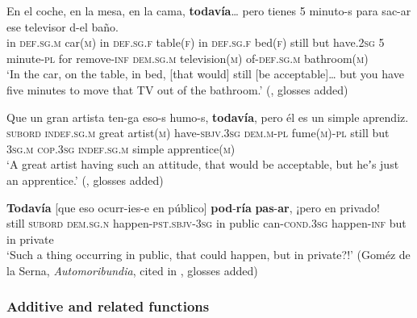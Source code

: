 \begin{exe}
	\ex\label{exAppendixSpanishTodaviaAcceptableLimits1}	
	\gll En el coche, en la mesa, en la cama, \textbf{todavía}… pero tienes 5 minuto-s para sac-ar ese televisor d-el baño.\\
	in \textsc{def}.\textsc{sg}.\textsc{m} car(\textsc{m}) in \textsc{def}.\textsc{sg}.\textsc{f} table(\textsc{f}) in \textsc{def}.\textsc{sg}.\textsc{f} bed(\textsc{f}) still but have.2\textsc{sg} 5 minute-\textsc{pl} for remove-\textsc{inf} \textsc{dem}.\textsc{sg}.\textsc{m} television(\textsc{m}) of-\textsc{def}.\textsc{sg}.\textsc{m} bathroom(\textsc{m})\\
	\glt \lq In the car, on the table, in bed, [that would] still [be acceptable]… but you have five minutes to move that TV out of the bathroom.' (\cite{Deloor2012}, glosses added)
	
	\ex\label{exAppendixSpanishTodaviaAcceptableLimits2}
	\gll Que un gran artista ten-ga eso-s humo-s, \textbf{todavía}, pero él es un simple aprendiz.\\
	\textsc{subord} \textsc{indef}.\textsc{sg}.\textsc{m} great artist(\textsc{m}) have-\textsc{sbjv}.3\textsc{sg} \textsc{dem}.\textsc{m}-\textsc{pl} fume(\textsc{m})-\textsc{pl} still but \textsc{3sg.m} \textsc{cop}.3\textsc{sg} \textsc{indef}.\textsc{sg}.\textsc{m} simple apprentice(\textsc{m})\\
	\glt \lq A great artist having such an attitude, that would be acceptable, but heʼs just an apprentice.\rq{ }(\cite[207]{Bosque2016}, glosses added)
	
	\ex\label{exAppendixSpanishTodaviaAcceptableLimits3}
	\gll
	\textbf{Todavía} \textup{[}que eso ocurr-ies-e en público\textup{]} \textbf{pod}-\textbf{ría} \textbf{pas}-\textbf{ar}, ¡pero en privado!\\
	still \phantom{[}\textsc{subord} \textsc{dem}.\textsc{sg}.\textsc{n} happen-\textsc{pst}.\textsc{sbjv}-3\textsc{sg} in public can-\textsc{cond}.3\textsc{sg} happen-\textsc{inf} \phantom{¡}but in private\\
	\glt \lq Such a thing occurring in public, that could happen, but in private?!'
	(Goméz de la Serna, \textit{Automoribundia}, cited in \cite[222]{Bosque2016}, glosses added)
\end{exe}

\subsubsection{Additive and related functions}
